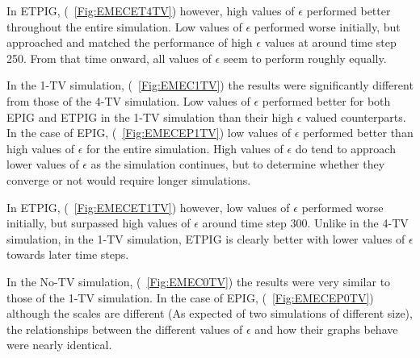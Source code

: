 \documentclass[12pt]{thesis}
\begin{document}
In ETPIG, (\figurename~\ref{Fig:EMECET4TV}) however, high values of $\epsilon$ performed better throughout the entire simulation. Low values of $\epsilon$ performed worse initially, but approached and matched the performance of high $\epsilon$ values at around time step 250. From that time onward, all values of $\epsilon$ seem to perform roughly equally.

In the 1-TV simulation, (\figurename~\ref{Fig:EMEC1TV}) the results were significantly different from those of the 4-TV simulation. Low values of $\epsilon$ performed better for both EPIG and ETPIG in the 1-TV simulation than their high $\epsilon$ valued counterparts. In the case of EPIG, (\figurename~\ref{Fig:EMECEP1TV}) low values of $\epsilon$ performed better than high values of $\epsilon$ for the entire simulation. High values of $\epsilon$ do tend to approach lower values of $\epsilon$ as the simulation continues, but to determine whether they converge or not would require longer simulations.

In ETPIG, (\figurename~\ref{Fig:EMECET1TV}) however, low values of $\epsilon$ performed worse initially, but surpassed high values of $\epsilon$ around time step 300. Unlike in the 4-TV simulation, in the 1-TV simulation, ETPIG is clearly better with lower values of $\epsilon$ towards later time steps.

In the No-TV simulation, (\figurename~\ref{Fig:EMEC0TV}) the results were very similar to those of the 1-TV simulation. In the case of EPIG, (\figurename~\ref{Fig:EMECEP0TV}) although the scales are different (As expected of two simulations of different size), the relationships between the different values of $\epsilon$ and how their graphs behave were nearly identical.
\end{document}
